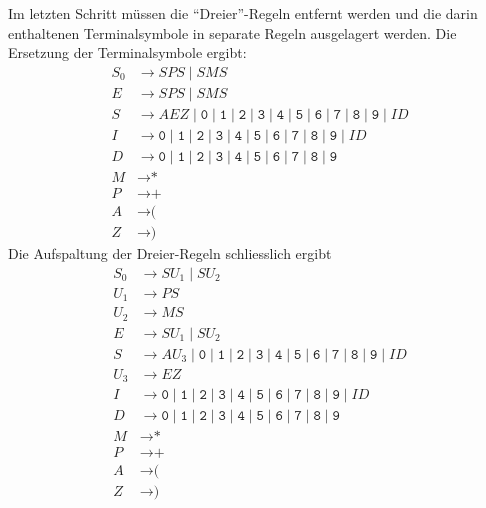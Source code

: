 \begin{loesung}
\begin{teilaufgaben}
Im letzten Schritt müssen die ``Dreier''-Regeln entfernt werden
und die darin enthaltenen Terminalsymbole in separate Regeln ausgelagert
werden.
Die Ersetzung der Terminalsymbole ergibt:
\begin{align*}
S_0&\to SPS \mid  SMS \\
E&\to SPS \mid  SMS \\
S&\to AEZ \mid 
\texttt{0}
\mid 
\texttt{1}
\mid 
\texttt{2}
\mid 
\texttt{3}
\mid 
\texttt{4}
\mid 
\texttt{5}
\mid 
\texttt{6}
\mid 
\texttt{7}
\mid 
\texttt{8}
\mid 
\texttt{9}
\mid  I D \\
I&\to 
\texttt{0}
\mid 
\texttt{1}
\mid 
\texttt{2}
\mid 
\texttt{3}
\mid 
\texttt{4}
\mid 
\texttt{5}
\mid 
\texttt{6}
\mid 
\texttt{7}
\mid 
\texttt{8}
\mid 
\texttt{9}
\mid  I D \\
D&\to
\texttt{0}
\mid 
\texttt{1}
\mid 
\texttt{2}
\mid 
\texttt{3}
\mid 
\texttt{4}
\mid 
\texttt{5}
\mid 
\texttt{6}
\mid 
\texttt{7}
\mid 
\texttt{8}
\mid 
\texttt{9}
\\
M&\to \texttt{*}\\
P&\to \texttt{+}\\
A&\to \texttt{(}\\
Z&\to \texttt{)}
\end{align*}
Die Aufspaltung der Dreier-Regeln schliesslich ergibt
\begin{align*}
S_0&\to SU_1 \mid  SU_2 \\
U_1&\to PS \\
U_2&\to MS \\
E&\to SU_1 \mid  SU_2 \\
S&\to AU_3 \mid  
\texttt{0}
\mid 
\texttt{1}
\mid 
\texttt{2}
\mid 
\texttt{3}
\mid 
\texttt{4}
\mid 
\texttt{5}
\mid 
\texttt{6}
\mid 
\texttt{7}
\mid 
\texttt{8}
\mid 
\texttt{9}
\mid  I D \\
U_3&\to EZ\\
I&\to 
\texttt{0}
\mid 
\texttt{1}
\mid 
\texttt{2}
\mid 
\texttt{3}
\mid 
\texttt{4}
\mid 
\texttt{5}
\mid 
\texttt{6}
\mid 
\texttt{7}
\mid 
\texttt{8}
\mid 
\texttt{9}
\mid  I D \\
D&\to
\texttt{0}
\mid 
\texttt{1}
\mid 
\texttt{2}
\mid 
\texttt{3}
\mid 
\texttt{4}
\mid 
\texttt{5}
\mid 
\texttt{6}
\mid 
\texttt{7}
\mid 
\texttt{8}
\mid 
\texttt{9}
\\
M&\to \texttt{*}\\
P&\to \texttt{+}\\
A&\to \texttt{(}\\
Z&\to \texttt{)}
\end{align*}

\end{teilaufgaben}
\end{loesung}
